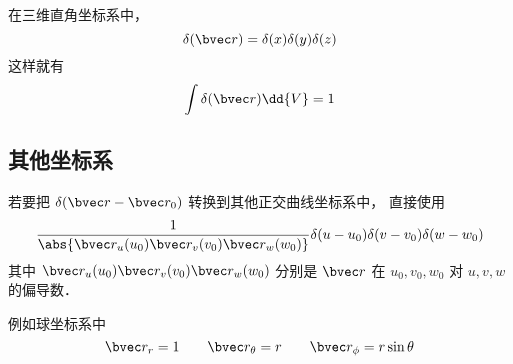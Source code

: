 
\begin{issues}
\issueDraft
\end{issues}


在三维直角坐标系中， 
\begin{equation}
\delta(\bvec r) = \delta(x)\delta(y)\delta(z)
\end{equation}
这样就有
\begin{equation}
\int \delta(\bvec r) \dd{V} = 1
\end{equation}

\subsection{其他坐标系}
若要把 $\delta(\bvec r - \bvec r_0)$ 转换到其他正交曲线坐标系中， 直接使用
\begin{equation}
\frac{1}{\abs{\bvec r_u(u_0)\bvec r_v(v_0)\bvec r_w(w_0)}}\delta(u - u_0)\delta(v - v_0)\delta(w - w_0)
\end{equation}
其中 $\bvec r_u(u_0)\bvec r_v(v_0)\bvec r_w(w_0)$ 分别是 $\bvec r$ 在 $u_0,v_0,w_0$ 对 $u, v, w$ 的偏导数．

例如球坐标系中
\begin{equation}
\bvec r_r = 1 \qquad \bvec r_\theta = r \qquad \bvec r_\phi = r\sin\theta
\end{equation}
